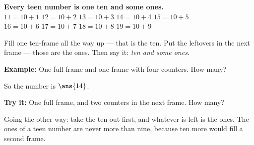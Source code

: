 \documentclass[14pt]{extarticle}
\begin{document}

\begin{formulabox}
\textbf{Every teen number is one ten and some ones.}\\[3pt]
$11 = 10 + 1$ \quad $12 = 10 + 2$ \quad $13 = 10 + 3$ \quad $14 = 10 + 4$
\quad $15 = 10 + 5$\\[2pt]
$16 = 10 + 6$ \quad $17 = 10 + 7$ \quad $18 = 10 + 8$ \quad $19 = 10 + 9$
\end{formulabox}


\begin{formulabox}
Fill one ten-frame all the way up --- that is the ten. Put the leftovers in the
next frame --- those are the ones. Then say it: \emph{ten and some ones}.
\end{formulabox}

\begin{examplebox}
\textbf{Example:} One full frame and one frame with four counters. How many?
\begin{center}
\end{center}
So the number is $\ans{14}$.
\end{examplebox}

\begin{tryitbox}
\textbf{Try it:} One full frame, and two counters in the next frame. How
many?\\[2pt]
\end{tryitbox}


\begin{formulabox}
Going the other way: take the ten out first, and whatever is left is the ones.
The ones of a teen number are never more than nine, because ten more would fill
a second frame.
\end{formulabox}
\end{document}
